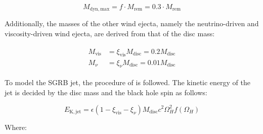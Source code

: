     \begin{equation}
        \label{eq:constraint}
        M_{\mathrm{dyn, max}} = f \cdot M_{\mathrm{rem}} = 0.3 \cdot M_{\mathrm{rem}}
    \end{equation}

    Additionally, the masses of the other wind ejecta, namely the neutrino-driven and
    viscosity-driven wind ejecta, are derived from that of the disc mass:

    \begin{align}
        \begin{split}
            M_{\mathrm{vis}} &=
                \xi_{\mathrm{vis}}M_{\mathrm{disc}} =
                    0.2M_{\mathrm{disc}} \\
            M_{\nu} &=
                \xi_{\nu}M_{\mathrm{disc}} =
                    0.01 M_{\mathrm{disc}}
        \end{split}
    \end{align}

    To model the SGRB jet, the procedure of \cite{zhu_2020} is followed. The
    kinetic energy of the jet is decided by the disc mass and the black hole spin as
    follows:

    \begin{equation}
        E_{\mathrm{K, jet}} =
            \epsilon(1 - \xi_{\mathrm{vis}} - \xi_{\nu})
            M_{\mathrm{disc}} c^2 \Omega_H^2 f(\Omega_H)
        \label{eq:e_kin_jet}
    \end{equation}

    Where:

